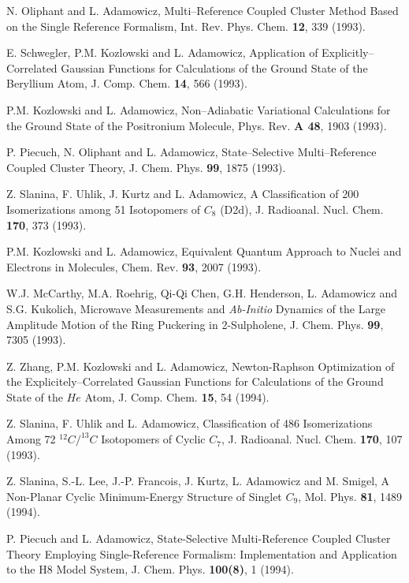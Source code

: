 \begin{thebibliography}{999}


N. Oliphant and L. Adamowicz, Multi--Reference Coupled Cluster 
Method Based on the Single
Reference Formalism, Int. Rev. Phys. Chem. {\bf 12}, 339 (1993).

E. Schwegler, P.M. Kozlowski and L. Adamowicz, 
Application of Explicitly--Correlated Gaussian
Functions for Calculations of the 
Ground State of the Beryllium Atom, J. Comp. Chem. {\bf 14}, 566 (1993).

P.M. Kozlowski and L. Adamowicz, Non--Adiabatic 
Variational Calculations for the Ground State of
the Positronium Molecule, Phys. Rev. {\bf A 48}, 1903 (1993).

   P. Piecuch, N. Oliphant and L. Adamowicz, 
State--Selective Multi--Reference Coupled Cluster Theory,
J. Chem. Phys. {\bf 99}, 1875 (1993).

   Z. Slanina, F. Uhlik, J. Kurtz and L. Adamowicz, 
A Classification of 200 Isomerizations among 51
Isotopomers of $C_8$ (D2d), J. Radioanal. Nucl. Chem. {\bf 170}, 
373 (1993).

P.M. Kozlowski and L. Adamowicz, Equivalent 
Quantum Approach to Nuclei and Electrons in
Molecules, Chem. Rev. {\bf 93}, 2007 (1993).

   W.J. McCarthy, M.A. Roehrig, Qi-Qi Chen, 
G.H. Henderson, L. Adamowicz and S.G. Kukolich,
Microwave Measurements and {\it Ab-Initio} Dynamics of the Large 
Amplitude Motion of the Ring
Puckering in 2-Sulpholene, J. Chem. Phys. {\bf 99}, 7305 (1993).

Z. Zhang, P.M. Kozlowski and L. Adamowicz, Newton-Raphson 
Optimization of the Explicitely--Correlated 
Gaussian Functions for Calculations of 
the Ground State of the $He$ Atom, J. Comp. Chem.
{\bf 15}, 54 (1994).

Z. Slanina, F. Uhlik and L. Adamowicz, 
Classification of 486 Isomerizations Among 72 $^{12}C/^{13}C$
Isotopomers of Cyclic $C_7$, J. Radioanal. 
Nucl. Chem. {\bf 170}, 107 (1993).

Z. Slanina, S.-L. Lee, J.-P. Francois, J. Kurtz, L. Adamowicz 
and  M. Smigel, A Non-Planar Cyclic
Minimum-Energy Structure of Singlet $C_9$, 
Mol. Phys. {\bf 81}, 1489 (1994).

P. Piecuch and L. Adamowicz, State-Selective Multi-Reference 
Coupled Cluster Theory Employing
Single-Reference Formalism:  Implementation and Application 
to the H8 Model System, J. Chem. Phys.
{\bf 100(8)}, 1 (1994).


\end{thebibliography}

